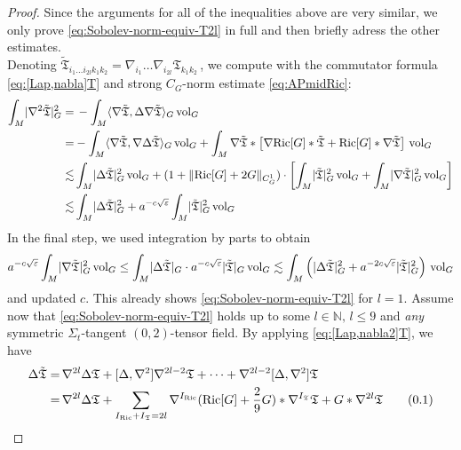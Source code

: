 \documentclass[11pt,leqno,textwidth=10cm]{amsart}
\numberwithin{equation}{section}
\theoremstyle{definition}
\theoremstyle{plain}
\newcommand{\1}{\mathbbm{1}}
\newcommand{\N}{\mathbb{N}}
\newcommand{\Ric}{\text{\normalfont{Ric}}}
\newcommand{\vol}[1]{{\text{\normalfont{vol}}}_{#1}}
\renewcommand{\epsilon}{\varepsilon}
\newcommand{\Lap}{\Delta}
\newcommand{\numberthis}{\addtocounter{equation}{1}\tag{\theequation}}
\renewcommand{\theequation}{\arabic{section}.\arabic{equation}}
\newcommand{\change}[1]{\color{black}#1\color{black}}
\begin{document}
\begin{proof} Since the arguments for all of the inequalities above are very similar, we only prove \eqref{eq:Sobolev-norm-equiv-T2l} in full and then briefly adress the other estimates.\\
Denoting $\tilde{\mathfrak{T}}_{i_1\dots i_{2l}k_1k_2}=\nabla_{i_1}\dots\nabla_{i_{2l}}\mathfrak{T}_{k_1k_2}\,$, we compute with the commutator formula \eqref{eq:[Lap,nabla]T} and strong $C_G$-norm estimate \eqref{eq:APmidRic}:
\begin{align*}
\int_M\lvert\nabla^2\tilde{\mathfrak{T}}\rvert_G^2=&\,-\int_M\langle\nabla\tilde{\mathfrak{T}},\Lap\nabla\tilde{\mathfrak{T}}\rangle_G\,\vol{G}\\
=&-\int_M\langle\nabla\tilde{\mathfrak{T}},\nabla\Lap\tilde{\mathfrak{T}}\rangle_G\,\vol{G}+\int_M\nabla\tilde{\mathfrak{T}}\ast\left[\nabla\Ric[G]\ast \tilde{\mathfrak{T}}+\Ric[G]\ast\nabla\tilde{\mathfrak{T}}\right]\,\vol{G}\\
\lesssim& \int_M\lvert\Lap\tilde{\mathfrak{T}}\rvert_G^2\,\vol{G}+(1+\|\Ric[G]+2G\|_{{C}^1_G})\cdot\left[\int_M\lvert\tilde{\mathfrak{T}}\rvert_G^2\,\vol{G}+\int_M\lvert\nabla\tilde{\mathfrak{T}}\rvert_G^2\,\vol{G}\right]\\
\lesssim&\int_M \lvert\Lap\tilde{\mathfrak{T}}\rvert_G^2+a^{-c\sqrt{\epsilon}}\int_M\lvert\tilde{\mathfrak{T}}\rvert_G^2\,\vol{G}
\end{align*}
In the final step, we used integration by parts to obtain
\[a^{-c\sqrt{\epsilon}}\int_M\lvert\nabla\tilde{\mathfrak{T}}\rvert_G^2\,\vol{G}\leq \int_M\lvert\Lap\tilde{\mathfrak{T}}\rvert_G\cdot a^{-c\sqrt{\epsilon}}\lvert\tilde{\mathfrak{T}}\rvert_G\,\vol{G}\lesssim \int_M\left(\lvert\Lap\tilde{\mathfrak{T}}\rvert_G^2+a^{-2c\sqrt{\epsilon}}\lvert\tilde{\mathfrak{T}}\rvert_G^2\right)\,\vol{G}\]
and updated $c$. This already shows \eqref{eq:Sobolev-norm-equiv-T2l} for $l=1$. Assume now that \eqref{eq:Sobolev-norm-equiv-T2l} holds up to some $l\in\N,\, l\leq 9$ and \textit{any} symmetric $\Sigma_t$-tangent $(0,2)$-tensor field. By applying \change{\eqref{eq:[Lap,nabla2]T}}, we have
\change{\begin{align*}
\Lap\tilde{\mathfrak{T}}%
=&\,\nabla^{2l}\Lap\mathfrak{T}+[\Lap,\nabla^2]\nabla^{2l-2}\mathfrak{T}+\dots+\nabla^{2l-2}[\Lap,\nabla^2]\mathfrak{T}\\
=&\,\nabla^{2l}\Lap\mathfrak{T}+\sum_{I_\Ric+I_\mathfrak{T}=2l}\nabla^{I_\Ric}(\Ric[G]+\frac29G)\ast\nabla^{I_\mathfrak{T}}\mathfrak{T}+G\ast\nabla^{2l}\mathfrak{T}\numberthis\label{eq:lap-sob-equiv-crucial}

\end{align*}}
\end{proof}
\end{document}
